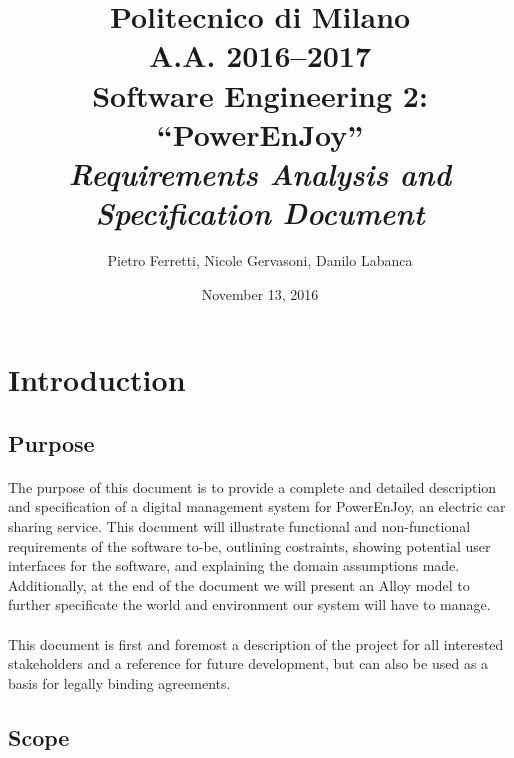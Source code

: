 \documentclass[english]{article}
\begin{document}
\title{Politecnico di Milano\\
 A.A. 2016–2017 \\
Software Engineering 2: “PowerEnJoy” \\
\emph{Requirements Analysis and Specification Document}}

\author{Pietro Ferretti, Nicole Gervasoni, Danilo Labanca}
\date{November 13, 2016}
\maketitle

\newpage

\tableofcontents{}

\newpage

\section{Introduction}

\subsection{Purpose}

\paragraph{}
The purpose of this document is to provide a complete and detailed description and specification of a digital management system for PowerEnJoy, an electric car sharing service. This document will
illustrate functional and non-functional requirements of the software to-be, outlining costraints, showing potential user interfaces for the software, and explaining the domain assumptions made. Additionally, at the end of the document we will present an Alloy model to further specificate the world and environment our system will have to manage.

\paragraph{}
This document is first and foremost a description of the project for all interested stakeholders and a reference for future development, but can also be used as a basis for legally binding agreements.


\subsection{Scope}
\end{document}
